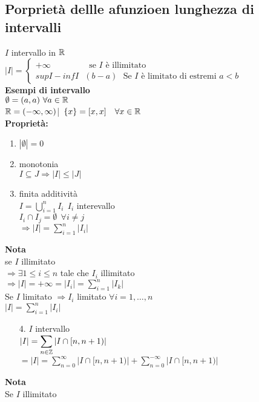 \documentclass{article}
\begin{document}
	\subsection{Porprietà dellle afunzioen lunghezza di intervalli}
	$I$ intervallo in $\mathbb{R}$ \\
	$|I| = \begin{cases}
		+\infty \ \ \ \ \ \ \ \ \ \ \ \ \ \ \ \ \ \ \ \text { se } I \text { è illimitato}\\
		sup I - inf I  \ \ \ (b - a)  \ \ \ \text{Se } I \text{ è limitato di estremi } a < b
	\end{cases}$\\
\textbf{Esempi di intervallo}\\
$\emptyset = (a,a) \ \forall a \in \mathbb{R}$\\
 $\mathbb{R} = (-\infty, \infty)$|\
 $\{x\} = [x,x] \ \ \ \forall x\in \mathbb{R}$ \\
 \textbf{Proprietà:}
 \begin{enumerate}
	 \item $|\emptyset  | = 0$
	 \item monotonia\\
		 $I\subseteq J \Rightarrow  |I| \leq |J|$
	 \item finita additività\\
		  $\displaystyle I = \bigcup^n_{i = 1} I_i \ \ I_i$ interevallo\\
		  $I_i\cap I_j = \emptyset \ \ \forall i\neq j$\\
		  $  \displaystyle \Rightarrow |I| = \sum^n_{i=1} |I_i|$
  \end{enumerate}
  \textbf{Nota}\\
se $I$ illimitato\\
$ \Rightarrow  \exists 1\leq i\leq n $ tale che $I_i$ illimitato\\
 $ \Rightarrow |I| = +\infty = |I_i| = \sum^n_{i=1}|I_k|$ \\
 Se $I$ limitato $ \Rightarrow  I_i$ limitato $\forall i = 1,\ldots, n$\\
$|I| = \sum^n_{i=1}|I_i|$
\begin{enumerate}
	\item[4.] $I$ intervallo\\
		$\displaystyle |I| = \sum_{n\in\mathbb{Z}}|I\cap [n,n+1)|$\\
		$\displaystyle = |I| = \sum^\infty_{n=0}|I\cap [n, n + 1)| + \sum^{-\infty}_{n=0}|I\cap [n, n + 1)|$
\end{enumerate}
\textbf{Nota}\\
Se $I$ illimitato \\
\end{document}
